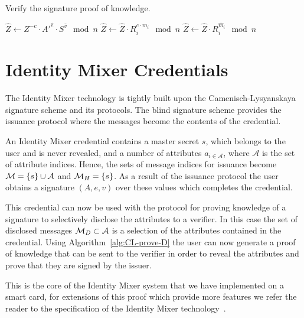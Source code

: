 \begin{algorithm}
  \caption{Verify the signature proof of knowledge.}
  \label{alg:CL-verify-D}
  \addtolength{\baselineskip}{1.5mm}

  \begin{algorithmic}[1]
      \State $\hat{Z} \gets Z^{-c} \cdot A'^{\hat{e}} \cdot S^{\hat{v}} \mod n$
        \State $\hat{Z} \gets \hat{Z} \cdot R_i^{c \cdot m_i} \mod n$
      \EndFor
        \State $\hat{Z} \gets \hat{Z} \cdot R_i^{\hat{m}_i} \mod n$
      \EndFor

        \Return {}
      \EndIf
      \Return {}
    \EndFunction
  \end{algorithmic}
\end{algorithm}

\section{Identity Mixer Credentials}

The Identity Mixer technology is tightly built upon the Camenisch-Lysyanskaya
signature scheme and its protocols. The blind signature scheme provides the
issuance protocol where the messages become the contents of the credential.

An Identity Mixer credential contains a master secret $s$, which belongs to the
user and is never revealed, and a number of attributes $a_{i \in \mathcal{A}}$,
where $\mathcal{A}$ is the set of attribute indices. Hence, the sets of message
indices for issuance become $\mathcal{M} = \{s\} \cup \mathcal{A}$ and $\mathcal{M}_H = \{s\}$.
As a result of the issuance protocol the user obtains a signature $(A, e, v)$
over these values which completes the credential.

This credential can now be used with the protocol for proving knowledge of a
signature to selectively disclose the attributes to a verifier. In this case the
set of disclosed messages $\mathcal{M}_D \subset \mathcal{A}$ is a selection of the
attributes contained in the credential. Using Algorithm~\ref{alg:CL-prove-D} the
user can now generate a proof of knowledge that can be sent to the verifier in
order to reveal the attributes and prove that they are signed by the issuer.

This is the core of the Identity Mixer system that we have implemented on a
smart card, for extensions of this proof which provide more features we refer
the reader to the specification of the Identity Mixer
technology~\cite{IdemixCrypto2012}.

